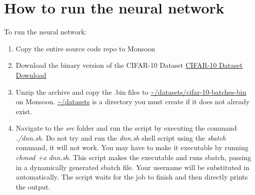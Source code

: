 \documentclass[conference]{IEEEtran}
\begin{document}
\section{How to run the neural network}
To run the neural network:
\begin{enumerate}
    \item Copy the entire source code repo to Monsoon
    \item Download the binary version of the CIFAR-10 Dataset \href{https://www.cs.toronto.edu/~kriz/cifar-10-binary.tar.gz}{CIFAR-10 Dataset Download}
    \item Unzip the archive and copy the .bin files to \newline\url{~/datasets/cifar-10-batches-bin} on Monsoon. \url{~/datasets} is a directory you must create if it does not already exist. 
    \item Navigate to the \textit{src} folder and run the script by executing the command \textit{./dnn.sh}. Do not try and run the \textit{dnn.sh} shell script using the \textit{sbatch} command, it will not work. You may have to make it executable by running \newline\textit{chmod +x dnn.sh}. This script makes the executable and runs sbatch, passing in a dynamically generated sbatch file. Your username will be substituted in automatically. The script waits for the job to finish and then directly prints the output. 
\end{enumerate}
\end{document}
